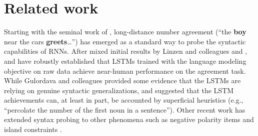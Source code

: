 
\section{Related work}



Starting with the seminal work of ,
long-distance number agreement (``the \textbf{boy} near the cars
\textbf{greets}\ldots'') has emerged as a standard way to probe the
syntactic capabilities of RNNs. After
mixed initial results by Linzen and colleagues and
,  and
 have robustly established that LSTMs
trained with the language modeling objective on raw data achieve
near-human performance on the agreement task. While Gulordava and
colleagues provided some evidence that the LSTMs are relying on
genuine syntactic generalizations,  and
 suggested that the LSTM achievements
can, at least in part, be accounted by superficial heuristics (e.g., ``percolate the number of the first noun in a sentence''). Other
recent work has extended syntax probing to other phenomena such as
negative polarity items and island constraints
\cite{Chowdhury:Zamparelli:2018,jumelet2018language,marvin2018targeted,wilcox2018rnn}.

